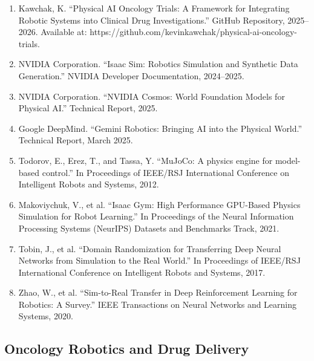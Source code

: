 \documentclass[11pt]{article}
\begin{document}
\begin{enumerate}[resume]
\item Kawchak, K. ``Physical AI Oncology Trials: A Framework for Integrating Robotic Systems into Clinical Drug Investigations.'' GitHub Repository, 2025--2026. Available at: https://github.com/kevinkawchak/physical-ai-oncology-trials.

\item NVIDIA Corporation. ``Isaac Sim: Robotics Simulation and Synthetic Data Generation.'' NVIDIA Developer Documentation, 2024--2025.

\item NVIDIA Corporation. ``NVIDIA Cosmos: World Foundation Models for Physical AI.'' Technical Report, 2025.

\item Google DeepMind. ``Gemini Robotics: Bringing AI into the Physical World.'' Technical Report, March 2025.

\item Todorov, E., Erez, T., and Tassa, Y. ``MuJoCo: A physics engine for model-based control.'' In Proceedings of IEEE/RSJ International Conference on Intelligent Robots and Systems, 2012.

\item Makoviychuk, V., et al. ``Isaac Gym: High Performance GPU-Based Physics Simulation for Robot Learning.'' In Proceedings of the Neural Information Processing Systems (NeurIPS) Datasets and Benchmarks Track, 2021.

\item Tobin, J., et al. ``Domain Randomization for Transferring Deep Neural Networks from Simulation to the Real World.'' In Proceedings of IEEE/RSJ International Conference on Intelligent Robots and Systems, 2017.

\item Zhao, W., et al. ``Sim-to-Real Transfer in Deep Reinforcement Learning for Robotics: A Survey.'' IEEE Transactions on Neural Networks and Learning Systems, 2020.
\end{enumerate}

\subsection*{Oncology Robotics and Drug Delivery}
\end{document}
